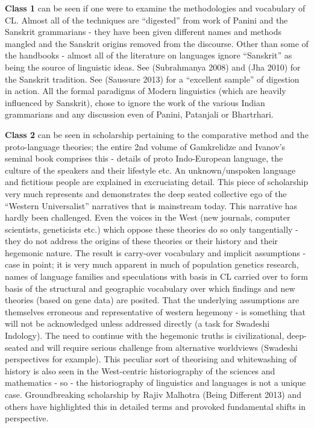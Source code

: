\textbf{Class 1} can be seen if one were to examine the methodologies and vocabulary of CL. Almost all of the techniques are “digested” from work of Panini and the Sanskrit grammarians - they have been given different names and methods mangled and the Sanskrit origins removed from the discourse. Other than some of the handbooks - almost all of the literature on languages ignore “Sanskrit” as being the source of linguistic ideas. See (Subrahmanya 2008) and (Jha 2010) for the Sanskrit tradition. See (Saussure 2013) for a “excellent sample” of digestion in action. All the formal paradigms of Modern linguistics (which are heavily influenced by Sanskrit), chose to ignore the work of the various Indian grammarians and any discussion even of Panini, Patanjali or Bhartrhari.

\textbf{Class 2} can be seen in scholarship pertaining to the comparative method and the proto-language theories; the entire 2nd volume of Gamkrelidze and Ivanov’s seminal book comprises this - details of proto Indo-European language, the culture of the speakers and their lifestyle etc. An unknown/unspoken language and fictitious people are explained in excruciating detail. This piece of scholarship very much represents and demonstrates the deep seated collective ego of the “Western Universalist” narratives that is mainstream today. This narrative has hardly been challenged. Even the voices in the West (new journals, computer scientists, geneticists etc.) which oppose these theories do so only tangentially - they do not address the origins of these theories or their history and their hegemonic nature. The result is carry-over vocabulary and implicit assumptions - case in point; it is very much apparent in much of population genetics research, names of language families and speculations with basis in CL carried over to form basis of the structural and geographic vocabulary over which findings and new theories (based on gene data) are posited. That the underlying assumptions are themselves erroneous and representative of western hegemony - is something that will not be acknowledged unless addressed directly (a task for Swadeshi Indology). The need to continue with the hegemonic truths is civilizational, deep-seated and will require serious challenge from alternative worldviews (Swadeshi perspectives for example). This peculiar sort of theorising and whitewashing of history is also seen in the West-centric historiography of the sciences and mathematics - so - the historiography of linguistics and languages is not a unique case. Groundbreaking scholarship by Rajiv Malhotra (Being Different 2013) and others have highlighted this in detailed terms and provoked fundamental shifts in perspective.

